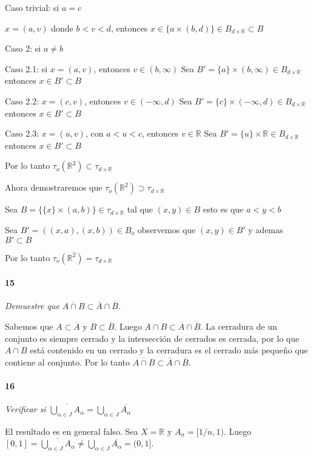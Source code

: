 \documentclass[12pt]{article}
\begin{document}
Caso trivial: si $a=c$ 

$x=(a,v)$ donde $b<v<d$, entonces $x\in \{a\times (b,d)\}\in B_{d\times \mathbb{R}}\subset B$

Caso 2: si $a\neq b$

Caso 2.1: si 
$x=(a,v)$, entonces $v\in(b,\infty)$ Sea $B'=\{a\}\times (b,\infty)\in B_{d\times \mathbb{R}}$
entonces $x\in B'\subset B$

Caso 2.2: $x=(c,v)$, entonces $v\in(-\infty,d)$ Sea $B'=\{c\}\times (-\infty,d)\in B_{d\times \mathbb{R}}$
entonces $x\in B'\subset B$

Caso 2.3: $x=(u,v)$, con $a<u<c$, entonces $v\in\mathbb{R}$ Sea $B'=\{u\}\times\mathbb{R}\in B_{d\times \mathbb{R}}$
entonces $x\in B'\subset B$

Por lo tanto $\tau_o(\mathbb{R}^2)\subset \tau_{d\times \mathbb{R}}$

Ahora demostraremos que $\tau_o(\mathbb{R}^2)\supset  \tau_{d\times \mathbb{R}}$

Sea $B=\{\{x\}\times(a,b)\}\in\tau_{d\times \mathbb{R}}$ tal que $(x,y)\in B$ esto es que $a<y<b$

Sea $B'=((x,a),(x,b))\in B_o$ observemos que $(x,y)\in B'$ y ademas $B'\subset B$ 

Por lo tanto $\tau_o(\mathbb{R}^2)=  \tau_{d\times \mathbb{R}}$

\paragraph{15}
\textit{Demuestre que $\overline{A \cap B} \subset \overline{A} \cap \overline{B}$.}

Sabemos que $A \subset \overline{A}$ y $B \subset \overline{B}$. Luego $A \cap B \subset \overline{A} \cap \overline{B}$. La cerradura de un conjunto es siempre
cerrado y la intersección de cerrados es cerrada, por lo que $A \cap B$ está contenido en un cerrado y la cerradura es el cerrado más pequeño que contiene al conjunto. Por lo tanto
$\overline{A \cap B} \subset \overline{A} \cap \overline{B}$.

\paragraph{16}
\textit{Verificar si $\overline{\bigcup\limits_{\alpha\in J}A_{\alpha}}=\bigcup\limits_{\alpha\in J}\overline{A_{\alpha}}$}

El resultado es en general falso. Sea $X=\mathbb{R}$ y $A_n=[1/n,1)$.
Luego $[0,1]=\overline{\bigcup\limits_{\alpha\in J}A_{\alpha}} \neq \bigcup\limits_{\alpha\in J}\overline{A_{\alpha}} =(0,1]$.
\end{document}
